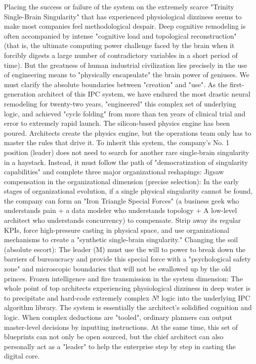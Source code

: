 \documentclass[11pt,a4paper]{article}
\begin{document}
Placing the success or failure of the system on the extremely scarce "Trinity Single-Brain Singularity" that has experienced physiological dizziness seems to make most companies feel methodological despair. Deep cognitive remodeling is often accompanied by intense "cognitive load and topological reconstruction" (that is, the ultimate computing power challenge faced by the brain when it forcibly digests a large number of contradictory variables in a short period of time). But the greatness of human industrial civilization lies precisely in the use of engineering means to "physically encapsulate" the brain power of geniuses. We must clarify the absolute boundaries between "creation" and "use". As the first-generation architect of this IPC system, we have endured the most drastic neural remodeling for twenty-two years, "engineered" this complex set of underlying logic, and achieved "cycle folding" from more than ten years of clinical trial and error to extremely rapid launch. The silicon-based physics engine has been poured. Architects create the physics engine, but the operations team only has to master the rules that drive it. To inherit this system, the company's No. 1 position (leader) does not need to search for another rare single-brain singularity in a haystack. Instead, it must follow the path of "democratization of singularity capabilities" and complete three major organizational reshapings: Jigsaw compensation in the organizational dimension (precise selection): In the early stages of organizational evolution, if a single physical singularity cannot be found, the company can form an "Iron Triangle Special Forces" (a business geek who understands pain + a data modeler who understands topology + A low-level architect who understands concurrency) to compensate. Strip away its regular KPIs, force high-pressure casting in physical space, and use organizational mechanisms to create a "synthetic single-brain singularity." Changing the soil (absolute escort): The leader (M) must use the will to power to break down the barriers of bureaucracy and provide this special force with a "psychological safety zone" and microscopic boundaries that will not be swallowed up by the old princes. Frozen intelligence and fire transmission in the system dimension: The whole point of top architects experiencing physiological dizziness in deep water is to precipitate and hard-code extremely complex $N!$ logic into the underlying IPC algorithm library. The system is essentially the architect’s solidified cognition and logic. When complex deductions are "tooled", ordinary planners can output master-level decisions by inputting instructions. At the same time, this set of blueprints can not only be open sourced, but the chief architect can also personally act as a "leader" to help the enterprise step by step in casting the digital core.
\end{document}

